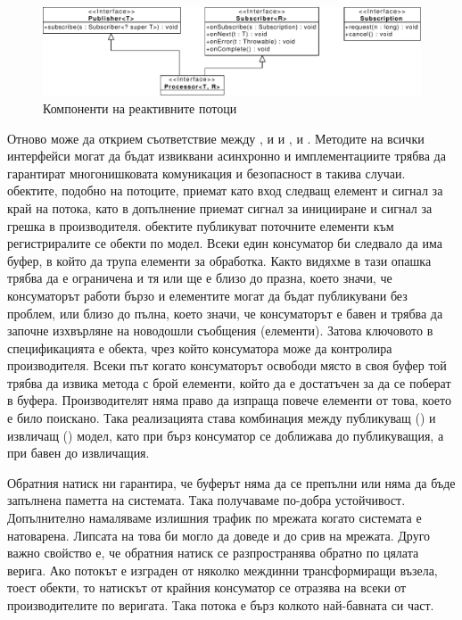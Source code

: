 \begin{figure}
  \centering\includegraphics[width=\textwidth]{images/reactive-streams.pdf}
  \caption{Компоненти на реактивните потоци}
  \label{fig:reactive-streams}
\end{figure}

Отново може да открием съответствие между ,  и  и ,  и . Методите на всички интерфейси могат да бъдат извиквани асинхронно и имплементациите трябва да гарантират многонишковата комуникация и безопасност в такива случаи.  обектите, подобно на  потоците, приемат като вход следващ елемент и сигнал за край на потока, като в допълнение приемат сигнал за иницииране и сигнал за грешка в производителя.  обектите публикуват поточните елементи към регистриралите се  обекти по  модел. Всеки един консуматор би следвало да има буфер, в който да трупа елементи за обработка. Както видяхме в  тази опашка трябва да е ограничена и тя или ще е близо до празна, което значи, че консуматорът работи бързо и елементите могат да бъдат публикувани без проблем, или близо до пълна, което значи, че консуматорът е бавен и трябва да започне изхвърляне на новодошли съобщения (елементи). Затова ключовото в спецификацията е  обекта, чрез който консуматора може да контролира производителя. Всеки път когато консуматорът освободи място в своя буфер той трябва да извика  метода с брой елементи, който да е достатъчен за да се поберат в буфера. Производителят няма право да изпраща повече елементи от това, което е било поискано. Така реализацията става комбинация между публикуващ () и извличащ () модел, като при бърз консуматор се доближава до публикуващия, а при бавен до извличащия.

Обратния натиск ни гарантира, че буферът няма да се препълни или няма да бъде запълнена паметта на системата. Така получаваме по-добра устойчивост. Допълнително намаляваме излишния трафик по мрежата когато системата е натоварена. Липсата на това би могло да доведе и до срив на мрежата. Друго важно свойство е, че обратния натиск се разпространява обратно по цялата верига. Ако потокът е изграден от няколко междинни трансформиращи възела, тоест  обекти, то натискът от крайния консуматор се отразява на всеки от производителите по веригата. Така потока е бърз колкото най-бавната си част.

